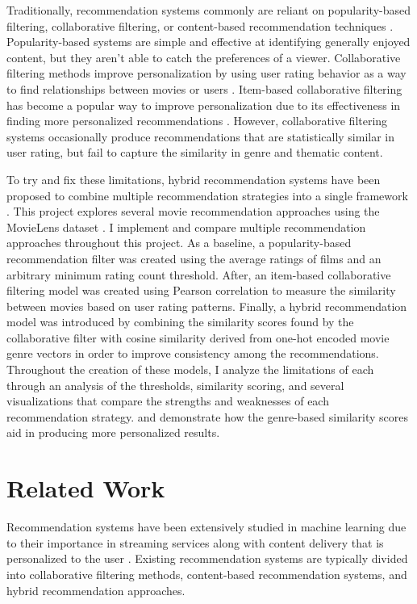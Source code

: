 \documentclass{article}
\begin{document}
Traditionally, recommendation systems commonly are reliant on popularity-based filtering, collaborative filtering, or content-based recommendation techniques \cite{lops2011contentbased}. Popularity-based systems are simple and effective at identifying generally enjoyed content, but they aren't able to catch the preferences of a viewer. Collaborative filtering methods improve personalization by using user rating behavior as a way to find relationships between movies or users \cite{resnick1994grouplens}. Item-based collaborative filtering has become a popular way to improve personalization due to its effectiveness in finding more personalized recommendations \cite{sarwar2001itembased}. However, collaborative filtering systems occasionally produce recommendations that are statistically similar in user rating, but fail to capture the similarity in genre and thematic content.

To try and fix these limitations, hybrid recommendation systems have been proposed to combine multiple recommendation strategies into a single framework \cite{burke2002hybrid}. This project explores several movie recommendation approaches using the MovieLens dataset \cite{harper2015movielens}. I implement and compare multiple recommendation approaches throughout this project. As a baseline, a popularity-based recommendation filter was created using the average ratings of films and an arbitrary minimum rating count threshold. After, an item-based collaborative filtering model was created using Pearson correlation to measure the similarity between movies based on user rating patterns. Finally, a hybrid recommendation model was introduced by combining the similarity scores found by the collaborative filter with cosine similarity derived from one-hot encoded movie genre vectors in order to improve consistency among the recommendations. Throughout the creation of these models, I analyze the limitations of each through an analysis of the thresholds, similarity scoring, and several visualizations that compare the strengths and weaknesses of each recommendation strategy. and demonstrate how the genre-based similarity scores aid in producing more personalized results.

\section{Related Work}
Recommendation systems have been extensively studied in machine learning due to their importance in streaming services along with content delivery that is personalized to the user \cite{ricci2011recommender,adomavicius2005toward}. Existing recommendation systems are typically divided into collaborative filtering methods, content-based recommendation systems, and hybrid recommendation approaches.
\end{document}
